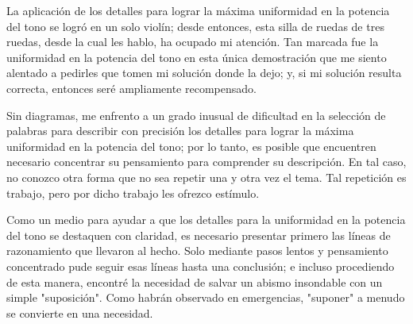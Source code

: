 \documentclass[12pt]{book}
\begin{document}
La aplicación de los detalles para lograr la máxima uniformidad en la potencia del tono se logró en un solo violín; desde entonces, esta silla de ruedas de tres ruedas, desde la cual les hablo, ha ocupado mi atención. Tan marcada fue la uniformidad en la potencia del tono en esta única demostración que me siento alentado a pedirles que tomen mi solución donde la dejo; y, si mi solución resulta correcta, entonces seré ampliamente recompensado.

Sin diagramas, me enfrento a un grado inusual de dificultad en la selección de palabras para describir con precisión los detalles para lograr la máxima uniformidad en la potencia del tono; por lo tanto, es posible que encuentren necesario concentrar su pensamiento para comprender su descripción. En tal caso, no conozco otra forma que no sea repetir una y otra vez el tema. Tal repetición es trabajo, pero por dicho trabajo les ofrezco estímulo.

Como un medio para ayudar a que los detalles para la uniformidad en la potencia del tono se destaquen con claridad, es necesario presentar primero las líneas de razonamiento que llevaron al hecho. Solo mediante pasos lentos y pensamiento concentrado pude seguir esas líneas hasta una conclusión; e incluso procediendo de esta manera, encontré la necesidad de salvar un abismo insondable con un simple "suposición". Como habrán observado en emergencias, "suponer" a menudo se convierte en una necesidad.
\end{document}
